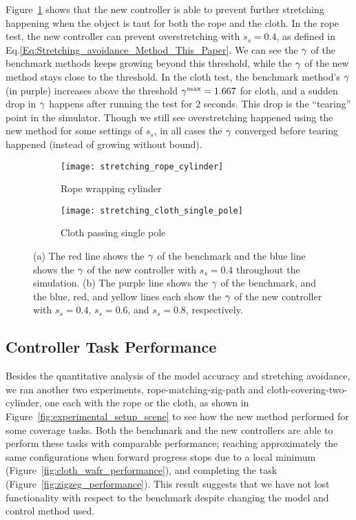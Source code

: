 Figure~\ref{fig:experiment_stretching_factor} shows that the new controller is able to prevent further stretching happening when the object is taut for both the rope and the cloth. In the rope test, the new controller can prevent overstretching with $s_s = 0.4$, as defined in Eq.\ref{Eq:Stretching_avoidance_Method_This_Paper}. We can see the $\gamma$ of the benchmark methods keeps growing beyond this threshold, while the $\gamma$ of the new method stays close to the threshold. In the cloth test, the benchmark method's $\gamma$ (in purple) increases above the threshold $\gamma^{\textrm{max}} = 1.667$ for cloth, and a sudden drop in $\gamma$ happens after running the test for $2$ seconds. This drop is the ``tearing'' point in the simulator. Though we still see overstretching happened using the new method for some settings of $s_s$, in all cases the $\gamma$ converged before tearing happened (instead of growing without bound). 

\begin{figure}[h]
    \centering
    \begin{subfigure}{0.49\textwidth}
        \centering
        \texttt{[image: stretching\_rope\_cylinder]}%
        \caption{Rope wrapping cylinder}
    \end{subfigure}\hfill
    \begin{subfigure}{0.49\textwidth}
        \texttt{[image: stretching\_cloth\_single\_pole]}%
        \caption{Cloth passing single pole}
    \end{subfigure}
    \caption{(a) The red line shows the $\gamma$ of the benchmark and the blue line shows the $\gamma$ of the new controller with $s_s = 0.4$ throughout the simulation. (b) The purple line shows the $\gamma$ of the benchmark, and the blue, red, and yellow lines each show the $\gamma$ of the new controller with $s_s = 0.4$, $s_s = 0.6$, and $s_s = 0.8$, respectively.}
    \label{fig:experiment_stretching_factor}
\end{figure}

\FloatBarrier

\subsection{Controller Task Performance}
\label{Results:Controller Task Performance}

Besides the quantitative analysis of the model accuracy and stretching avoidance, we ran another two experiments, rope-matching-zig-path and cloth-covering-two-cylinder, one each with the rope or the cloth, as shown in Figure~\ref{fig:experimental_setup_scene} to see how the new method performed for some coverage tasks. Both the benchmark and the new controllers are able to perform these tasks with comparable performance; reaching approximately the same configurations when forward progress stops due to a local minimum (Figure~\ref{fig:cloth_wafr_performance}), and completing the task (Figure~\ref{fig:zigzeg_performance}). This result suggests that we have not lost functionality with respect to the benchmark despite changing the model and control method used.



